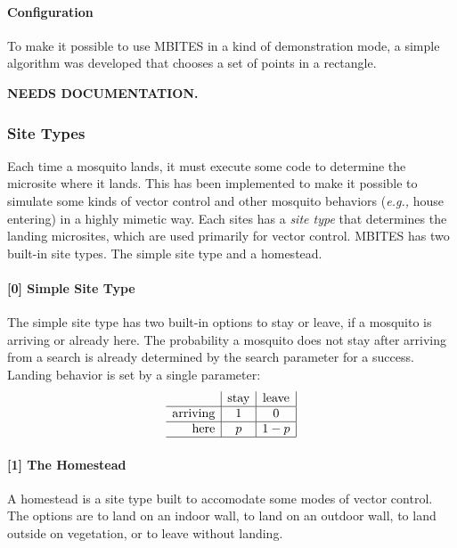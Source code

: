 \documentclass{article}
\newcommand{\eg}{{\em e.g., }}
\newcommand{\ND}{{\bf NEEDS DOCUMENTATION.}}
\begin{document}
\paragraph{Configuration}
To make it possible to use MBITES in a kind of demonstration mode, a simple algorithm was developed that chooses a set of points in a rectangle.

\ND



\clearpage 

\subsubsection{Site Types}

Each time a mosquito lands, it must execute some code to determine the microsite where it lands. This has been implemented to make it possible to simulate some kinds of vector control and other mosquito behaviors (\eg house entering) in a highly mimetic way. Each sites has a {\em site type} that determines the landing microsites, which are used primarily for vector control. MBITES has two built-in site types. The simple site type and a homestead. 

\paragraph{[0] Simple Site Type}

The simple site type has two built-in options to stay or leave, if a mosquito is arriving or already here. The probability a mosquito does not stay after arriving from a search is already determined by the search parameter for a success. Landing behavior is set by a single parameter:
\begin{equation}
\begin{array}{r|c|c|}
& \mbox{stay} & \mbox{leave} \\ \hline  
\mbox{arriving} & 1 & 0 \\ \hline 
\mbox{here} & p & 1-p \\ \hline 
\end{array}
\end{equation}

\paragraph{[1] The Homestead}

A homestead is a site type built to accomodate some modes of vector control. The options are to land on an indoor wall, to land on an outdoor wall, to land outside on vegetation, or to leave without landing.  
\end{document}
